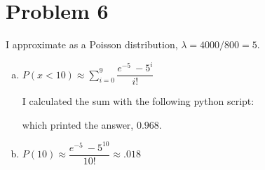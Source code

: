\documentclass[11pt]{article}
\begin{document}
\section*{Problem 6}
I approximate as a Poisson distribution, $\lambda = 4000/800 = 5$.


\begin{enumerate}[(a)]
	\item $P( x < 10 ) \approx \sum \limits_{i=0} ^9 \dfrac{e^{-5}\ -5^{i}}{i!}$
	
	I calculated the sum with the following python script:
	
	
	
	which printed the answer,  $0.968$.

	\item $P(10) \approx \dfrac{e^{-5}\ -5^{10}}{10!} \approx .018$
\end{enumerate}
\end{document}
